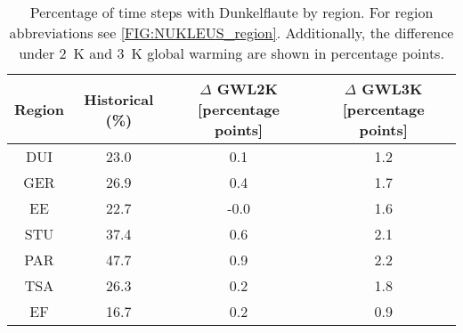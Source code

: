\begin{table}[!htbp]
\centering
\caption{Percentage of time steps with Dunkelflaute by region. For region abbreviations see \autoref{FIG:NUKLEUS_region}. Additionally, the difference under \qty{2}{\kelvin} and \qty{3}{\kelvin} global warming are shown in percentage points.}
\label{Table:Dunkelflaute_regions}
\begin{tabular}{cccc}
\hline
Region & Historical (\%) & $\Delta$ GWL2K [percentage points] & $\Delta$ GWL3K [percentage points] \\
\hline
DUI & 23.0 & 0.1 & 1.2\\

GER & 26.9 & 0.4 & 1.7\\

EE & 22.7 & -0.0 & 1.6\\

STU & 37.4 & 0.6 & 2.1\\

PAR & 47.7 & 0.9 & 2.2\\

TSA & 26.3 & 0.2 & 1.8\\

EF & 16.7 & 0.2 & 0.9\\

\bottomrule
\end{tabular}
\end{table}
